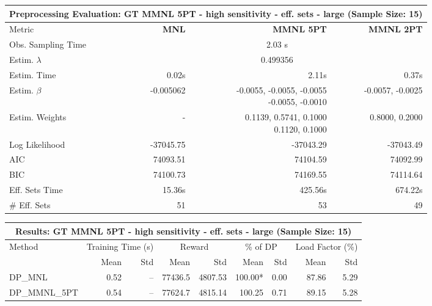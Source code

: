
\begin{samepage}
\begin{center}
  \small
  \begin{tabular}{l|r|r|r}
    \toprule
    \multicolumn{4}{c}{\textbf{Preprocessing Evaluation: GT MMNL 5PT - high sensitivity - eff. sets - large (Sample Size: 15)}} \\
    \midrule
    Metric & \textbf{MNL} & \textbf{MMNL 5PT} & \textbf{MMNL 2PT} \\
    \midrule
    Obs. Sampling Time & \multicolumn{3}{c}{2.03 s} \\
    Estim. $\lambda$ & \multicolumn{3}{c}{0.499356} \\
    Estim. Time & 0.02s & 2.11s & 0.37s \\
    Estim. $\beta$ & -0.005062 & \makecell[tr]{-0.0055, -0.0055, -0.0055 \\ -0.0055, -0.0010} & -0.0057, -0.0025 \\
    Estim. Weights & - & \makecell[tr]{0.1139, 0.5741, 0.1000 \\ 0.1120, 0.1000} & 0.8000, 0.2000 \\
    Log Likelihood & -37045.75 & -37043.29 & -37043.49 \\
    AIC & 74093.51 & 74104.59 & 74092.99 \\
    BIC & 74100.73 & 74169.55 & 74114.64 \\
    Eff. Sets Time & 15.36s & 425.56s & 674.22s \\
    \# Eff. Sets & 51 & 53 & 49 \\
    \bottomrule
  \end{tabular}
\end{center}
\begin{center}
  \small
  \begin{tabular}{l|rr|rr|rr|rr}
    \toprule
    \multicolumn{9}{c}{\textbf{Results: GT MMNL 5PT - high sensitivity - eff. sets - large (Sample Size: 15)}} \\
    \midrule
    Method & \multicolumn{2}{c|}{Training Time (s)} & \multicolumn{2}{c|}{Reward} & \multicolumn{2}{c|}{\% of DP} & \multicolumn{2}{c}{Load Factor (\%)} \\
    & Mean & Std & Mean & Std & Mean & Std & Mean & Std \\
    \midrule
    DP\_MNL      &     0.52 &    -- &    77436.5 &    4807.53 & 100.00* &    0.00 &   87.86 &    5.29 \\
    DP\_MMNL\_5PT &     0.54 &    -- &    77624.7 &    4815.14 &  100.25 &    0.71 &   89.15 &    5.28 \\

\end{tabular}
\end{center}
\end{samepage}
